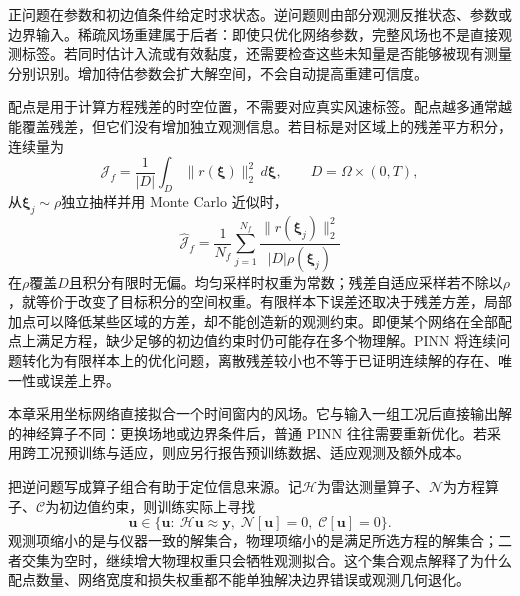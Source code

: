 正问题在参数和初边值条件给定时求状态。逆问题则由部分观测反推状态、参数或边界输入。稀疏风场重建属于后者：即使只优化网络参数，完整风场也不是直接观测标签。若同时估计入流或有效黏度，还需要检查这些未知量是否能够被现有测量分别识别。增加待估参数会扩大解空间，不会自动提高重建可信度。

配点是用于计算方程残差的时空位置，不需要对应真实风速标签。配点越多通常越能覆盖残差，但它们没有增加独立观测信息。若目标是对区域上的残差平方积分，连续量为
\[
\mathcal J_f=\frac1{|D|}\int_D\|r(\boldsymbol\xi)\|_2^2\,d\boldsymbol\xi,
\qquad D=\Omega\times(0,T),
\]
从$\boldsymbol\xi_j\sim\rho$独立抽样并用 Monte Carlo 近似时，
\[
\widehat{\mathcal J}_f=\frac1{N_f}\sum_{j=1}^{N_f}\frac{\|r(\boldsymbol\xi_j)\|_2^2}{|D|\rho(\boldsymbol\xi_j)}
\]
在$\rho$覆盖$D$且积分有限时无偏。均匀采样时权重为常数；残差自适应采样若不除以$\rho$，就等价于改变了目标积分的空间权重。有限样本下误差还取决于残差方差，局部加点可以降低某些区域的方差，却不能创造新的观测约束。即便某个网络在全部配点上满足方程，缺少足够的初边值约束时仍可能存在多个物理解。PINN 将连续问题转化为有限样本上的优化问题，离散残差较小也不等于已证明连续解的存在、唯一性或误差上界。

本章采用坐标网络直接拟合一个时间窗内的风场。它与输入一组工况后直接输出解的神经算子不同：更换场地或边界条件后，普通 PINN 往往需要重新优化。若采用跨工况预训练与适应，则应另行报告预训练数据、适应观测及额外成本。

把逆问题写成算子组合有助于定位信息来源。记$\mathcal H$为雷达测量算子、$\mathcal N$为方程算子、$\mathcal C$为初边值约束，则训练实际上寻找
\[
\mathbf u\in\{\mathbf u:\ \mathcal H\mathbf u\approx\mathbf y,\;\mathcal N[\mathbf u]=0,\;\mathcal C[\mathbf u]=0\}.
\]
观测项缩小的是与仪器一致的解集合，物理项缩小的是满足所选方程的解集合；二者交集为空时，继续增大物理权重只会牺牲观测拟合。这个集合观点解释了为什么配点数量、网络宽度和损失权重都不能单独解决边界错误或观测几何退化。

